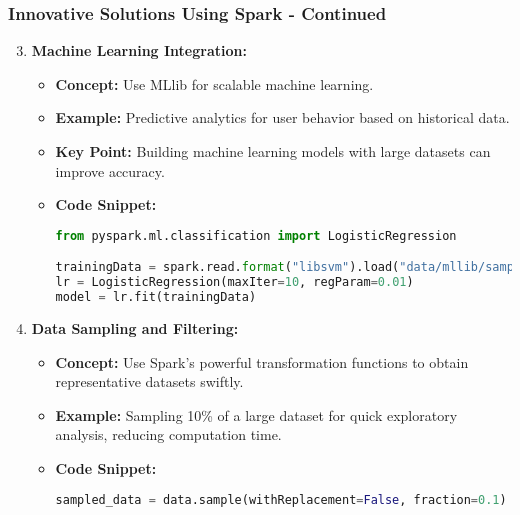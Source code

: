 \documentclass[aspectratio=169]{beamer}
\begin{document}
\begin{frame}[fragile]
    \frametitle{Innovative Solutions Using Spark - Continued}
    \begin{enumerate}
        \setcounter{enumi}{2} %
        \item \textbf{Machine Learning Integration:}
        \begin{itemize}
            \item \textbf{Concept:} Use MLlib for scalable machine learning.
            \item \textbf{Example:} Predictive analytics for user behavior based on historical data.
            \item \textbf{Key Point:} Building machine learning models with large datasets can improve accuracy.
            \item \textbf{Code Snippet:}
            \begin{lstlisting}[language=python]
from pyspark.ml.classification import LogisticRegression

trainingData = spark.read.format("libsvm").load("data/mllib/sample_libsvm_data.txt")
lr = LogisticRegression(maxIter=10, regParam=0.01)
model = lr.fit(trainingData)
            \end{lstlisting}
        \end{itemize}

        \item \textbf{Data Sampling and Filtering:}
        \begin{itemize}
            \item \textbf{Concept:} Use Spark's powerful transformation functions to obtain representative datasets swiftly.
            \item \textbf{Example:} Sampling 10\% of a large dataset for quick exploratory analysis, reducing computation time.
            \item \textbf{Code Snippet:}
            \begin{lstlisting}[language=python]
sampled_data = data.sample(withReplacement=False, fraction=0.1)
            \end{lstlisting}
        \end{itemize}
    \end{enumerate}
\end{frame}
\end{document}
